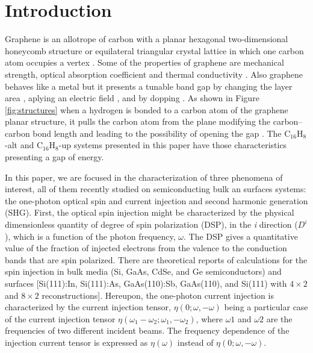 \documentclass[aps,pra,11pt,tightenlines,showpacs,superscriptaddress,groupedaddress]{revtex4-1}
\newcommand{\altstc}{C$_{16}$H$_{8}$-alt}
\newcommand{\upstc}{C$_{16}$H$_{8}$-up}
\begin{document}
\maketitle



\section{Introduction}\label{sec:intro}


Graphene is an allotrope of carbon with a planar hexagonal two-dimensional
honeycomb structure or equilateral triangular crystal lattice in which one
carbon atom occupies a vertex \cite{geim2007rise}. 
Some of the properties of graphene are mechanical
strength, optical absorption coefficient and thermal conductivity
\cite{geim2007rise, nair2008fine}. Also graphene behaves like a metal
\cite{geim2007rise} but it presents a tunable band gap by changing the layer
area \cite{han2007energy}, aplying an electric field \cite{zhang2009direct},
and by dopping \cite{ohta2006controlling,
elias2009control,guisinger2009exposure,samarakoon2010tunable}. As shown in
Figure \ref{fig:structures} when a hydrogen is bonded to a carbon atom of the
graphene planar structure, it pulls the carbon atom from the plane modifying the 
carbon--carbon bond length and leading to the possibility of opening the gap
\cite{samarakoon2010tunable}. The {\altstc} and {\upstc} systems presented in 
this paper have those characteristics presenting a gap of energy.


In this paper, we are focused in the characterization of three phenomena of
interest, all of them recently studied on semiconducting bulk an surfaces
systems: the one-photon optical spin and current injection and  second
harmonic generation (SHG). First, the optical spin injection might be
characterized by the physical dimensionless quantity of degree of spin
polarization (DSP), in the \emph{i} direction ($D^{i}$), which is a function of
the photon frequency, $\omega$. The DSP gives a quantitative value of the
fraction of injected electrons from the valence to the conduction bands that
are spin polarized. There are theoretical reports of calculations for the spin
injection in bulk media  (Si, GaAs, CdSe, and Ge semiconductors)
\cite{nastos2007full,cabellos2009stress,rioux2010optical} and surfaces
[Si(111):In, Si(111):As, GaAs(110):Sb, GaAs(110), and Si(111) with $4\times2$
and $8\times2$ reconstructions]\cite{mendoza2012optical,arzate2014optical}.
Hereupon, the one-photon current injection is characterized by the current
injection tensor, $\eta(0;\omega,-\omega)$  being a particular case of the
current injection tensor $\eta(\omega_{1}-\omega_{2};\omega_{1},-\omega_{2})$,
where $\omega{1}$ and $\omega{2}$ are the frequencies of two different incident
beams. The frequency dependence of the injection current tensor is expressed as
$\eta(\omega)$ instead of $\eta(0;\omega,-\omega)$.
\end{document}
